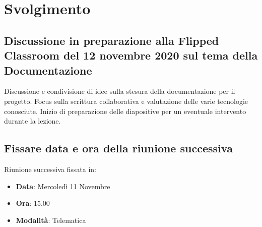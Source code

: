 \documentclass[]{article}
\begin{document}
\newpage

\section{Svolgimento}
\subsection{Discussione in preparazione alla Flipped Classroom del 12 novembre 2020 sul tema della Documentazione}
Discussione e condivisione di idee sulla stesura della documentazione per il progetto. Focus sulla scrittura collaborativa e valutazione delle varie tecnologie conosciute.
Inizio di preparazione delle diapositive per un eventuale intervento durante la lezione.\\

\subsection{Fissare data e ora della riunione successiva}
Riunione successiva fissata in:
\begin{itemize}
	\item \textbf{Data}: Mercoledì 11 Novembre
	\item \textbf{Ora}: 15.00
	\item \textbf{Modalità}: Telematica
\end{itemize}
\end{document}

